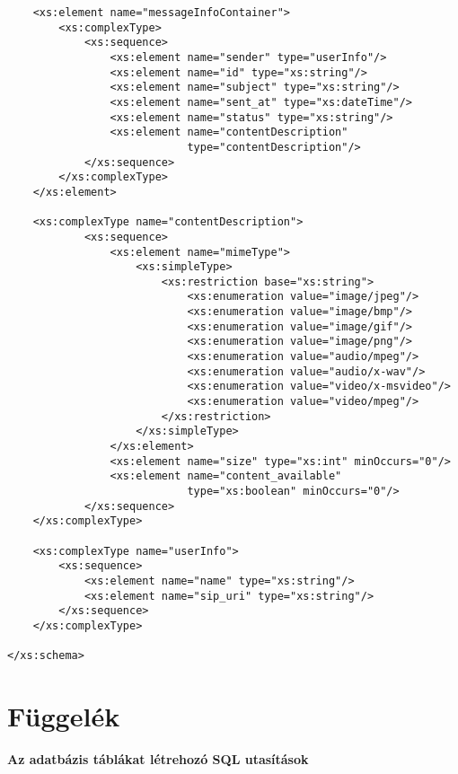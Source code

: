 \begin{verbatim}
    <xs:element name="messageInfoContainer">
        <xs:complexType>
            <xs:sequence>
                <xs:element name="sender" type="userInfo"/>                
                <xs:element name="id" type="xs:string"/>
                <xs:element name="subject" type="xs:string"/>
                <xs:element name="sent_at" type="xs:dateTime"/>
                <xs:element name="status" type="xs:string"/>
                <xs:element name="contentDescription" 
                            type="contentDescription"/>
            </xs:sequence>
        </xs:complexType>
    </xs:element>
    
    <xs:complexType name="contentDescription">
            <xs:sequence>
                <xs:element name="mimeType">
                    <xs:simpleType>
                        <xs:restriction base="xs:string">
                            <xs:enumeration value="image/jpeg"/>                                       
                            <xs:enumeration value="image/bmp"/>
                            <xs:enumeration value="image/gif"/>
                            <xs:enumeration value="image/png"/>                                     
                            <xs:enumeration value="audio/mpeg"/>
                            <xs:enumeration value="audio/x-wav"/>                               
                            <xs:enumeration value="video/x-msvideo"/>
                            <xs:enumeration value="video/mpeg"/>
                        </xs:restriction>
                    </xs:simpleType>
                </xs:element>
                <xs:element name="size" type="xs:int" minOccurs="0"/>
                <xs:element name="content_available" 
                            type="xs:boolean" minOccurs="0"/>
            </xs:sequence>        
    </xs:complexType>
    
    <xs:complexType name="userInfo">
        <xs:sequence>
            <xs:element name="name" type="xs:string"/>
            <xs:element name="sip_uri" type="xs:string"/>
        </xs:sequence>
    </xs:complexType>

</xs:schema>
\end{verbatim}
\fontsize{12}{12} 

\newpage 

\section{Függelék}
\label{sec:sql_utasitasok_fuggelek}

\noindent
{\bf Az adatbázis táblákat létrehozó SQL utasítások}

